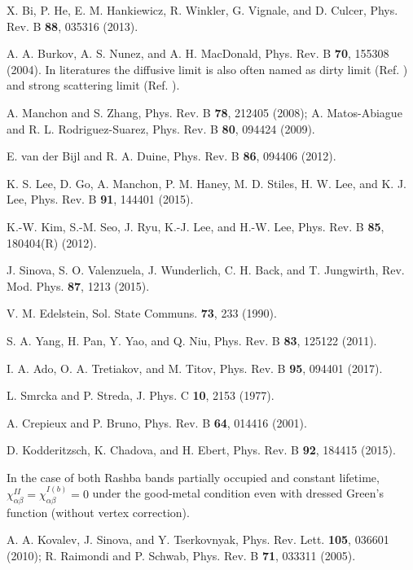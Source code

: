 \documentclass
[aps,pra,amsfonts,amssymb,twocolumn,amsmath,preprintnumbers,nofootinbib,floatfix,
showpacs,superscriptaddress]{revtex4-1}%
\begin{document}
\begin{thebibliography}{99}
X. Bi, P. He, E. M. Hankiewicz, R. Winkler, G. Vignale,
and D. Culcer, Phys. Rev. B \textbf{88}, 035316 (2013).

A. A. Burkov, A. S. Nunez, and A. H. MacDonald, Phys.
Rev. B \textbf{70}, 155308 (2004). In literatures the diffusive limit is also
often named as dirty limit (Ref. ) and strong
scattering limit (Ref. ).

A. Manchon and S. Zhang, Phys. Rev. B \textbf{78}, 212405
(2008); A. Matos-Abiague and R. L. Rodriguez-Suarez, Phys. Rev. B \textbf{80},
094424 (2009).

E. van der Bijl and R. A. Duine, Phys. Rev. B \textbf{86},
094406 (2012).

K. S. Lee, D. Go, A. Manchon, P. M. Haney, M. D. Stiles, H.
W. Lee, and K. J. Lee, Phys. Rev. B \textbf{91}, 144401 (2015).

K.-W. Kim, S.-M. Seo, J. Ryu, K.-J. Lee, and H.-W. Lee,
Phys. Rev. B \textbf{85}, 180404(R) (2012).

J. Sinova, S. O. Valenzuela, J. Wunderlich, C. H. Back,
and T. Jungwirth, Rev. Mod. Phys. \textbf{87}, 1213 (2015).

V. M. Edelstein, Sol. State Communs. \textbf{73}, 233 (1990).

S. A. Yang, H. Pan, Y. Yao, and Q. Niu, Phys. Rev. B
\textbf{83}, 125122 (2011).

I. A. Ado, O. A. Tretiakov, and M. Titov, Phys. Rev. B
\textbf{95}, 094401 (2017).

L. Smrcka and P. Streda, J. Phys. C \textbf{10}, 2153 (1977).

A. Crepieux and P. Bruno, Phys. Rev. B \textbf{64}, 014416 (2001).

D. Kodderitzsch, K. Chadova, and H. Ebert, Phys. Rev. B
\textbf{92}, 184415 (2015).

In the case of both Rashba bands partially occupied and
constant lifetime, $\chi_{\alpha\beta}^{II}=\chi_{\alpha\beta}^{I\left(
b\right)  }=0$ under the good-metal condition even with dressed Green's
function (without vertex correction).

A. A. Kovalev, J. Sinova, and Y. Tserkovnyak, Phys. Rev.
Lett. \textbf{105}, 036601 (2010); R. Raimondi and P. Schwab, Phys. Rev. B
\textbf{71}, 033311 (2005).


\end{thebibliography}
\end{document}
